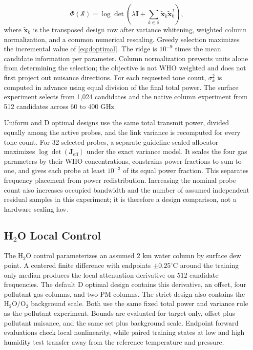 \documentclass[conference]{IEEEtran}
\begin{document}
\begin{equation}
\Phi(\mathcal{S})=\log\det\!\left(\lambda\boldsymbol I+
\sum_{k\in\mathcal{S}}\widetilde{\boldsymbol x}_k
\widetilde{\boldsymbol x}_k^T\right),
\label{eq:doptimal}
\end{equation}
where $\widetilde{\boldsymbol x}_k$ is the transposed design row after variance whitening, weighted column normalization, and a common numerical rescaling. Greedy selection maximizes the incremental value of \eqref{eq:doptimal}. The ridge is $10^{-9}$ times the mean candidate information per parameter. Column normalization prevents units alone from determining the selection; the objective is not WHO weighted and does not first project out nuisance directions. For each requested tone count, $\sigma_k^2$ is computed in advance using equal division of the final total power. The surface experiment selects from 1,024 candidates and the native column experiment from 512 candidates across 60 to 400 GHz.

Uniform and D optimal designs use the same total transmit power, divided equally among the active probes, and the link variance is recomputed for every tone count. For 32 selected probes, a separate guideline scaled allocator maximizes $\log\det(\boldsymbol J_{\mathrm{eff}})$ under the exact variance model. It scales the four gas parameters by their WHO concentrations, constrains power fractions to sum to one, and gives each probe at least $10^{-3}$ of its equal power fraction. This separates frequency placement from power redistribution. Increasing the nominal probe count also increases occupied bandwidth and the number of assumed independent residual samples in this experiment; it is therefore a design comparison, not a hardware scaling law.

\subsection{H$_2$O Local Control}

The H$_2$O control parameterizes an assumed 2 km water column by surface dew point. A centered finite difference with endpoints $\pm0.25^\circ$C around the training only median produces the local attenuation derivative on 512 candidate frequencies. The default D optimal design contains this derivative, an offset, four pollutant gas columns, and two PM columns. The strict design also contains the H$_2$O/O$_2$ background scale. Both use the same fixed total power and variance rule as the pollutant experiment. Bounds are evaluated for target only, offset plus pollutant nuisance, and the same set plus background scale. Endpoint forward evaluations check local nonlinearity, while paired training states at low and high humidity test transfer away from the reference temperature and pressure.
\end{document}
